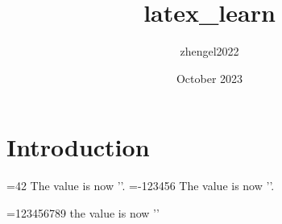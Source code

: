 \documentclass{article}
\title{latex_learn}
\author{zhengel2022 }
\date{October 2023}
\begin{document}
\maketitle

\section{Introduction}

=42
The value is now '\the{}'.
\def\macro{-123456}
=\macro
The value is now '\the{}'.


\def\firstmacro{123}
\def\secondmacro{456}
\def\thirdmacro{789}
=\firstmacro\secondmacro\thirdmacro
the value is now '\the{}'
\end{document}
